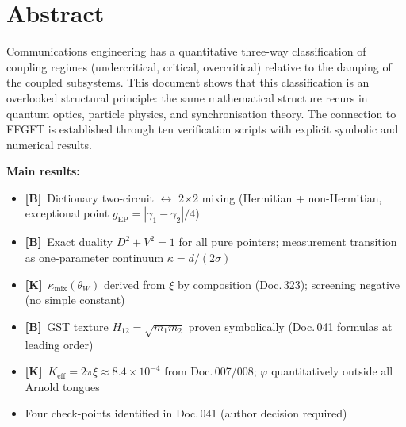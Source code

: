 
\providecommand{\K}{}\renewcommand{\K}{\textbf{[K]}}
\providecommand{\B}{}\renewcommand{\B}{\textbf{[B]}}
\renewcommand{\S}{\textbf{[S]}}
\providecommand{\SET}{}\renewcommand{\SET}{\textbf{[SETZUNG]}}
\providecommand{\E}{}\renewcommand{\E}{\textbf{[E]}}
\providecommand{\kk}{k_{\mathrm{crit}}}
\providecommand{\kmix}{\kappa_{\mathrm{mix}}}
\providecommand{\Keff}{K_{\mathrm{eff}}}
\providecommand{\xipar}{\xi}


\section*{Abstract}

Communications engineering has a quantitative three-way classification of coupling
regimes (undercritical, critical, overcritical) relative to the damping of the
coupled subsystems. This document shows that this classification is an overlooked
structural principle: the same mathematical structure recurs in quantum optics,
particle physics, and synchronisation theory. The connection to FFGFT is established
through ten verification scripts with explicit symbolic and numerical results.

\medskip
\noindent\textbf{Main results:}
\begin{itemize}
  \item \B\ Dictionary two-circuit $\leftrightarrow$ 2$\times$2 mixing (Hermitian +
    non-Hermitian, exceptional point $g_{\mathrm{EP}} = |\gamma_1-\gamma_2|/4$)
  \item \B\ Exact duality $D^2+V^2=1$ for all pure pointers; measurement transition
    as one-parameter continuum $\kappa = d/(2\sigma)$
  \item \K\ $\kmix(\theta_W)$ derived from $\xi$ by composition (Doc.\,323);
    screening negative (no simple constant)
  \item \B\ GST texture $H_{12}=\sqrt{m_1 m_2}$ proven symbolically (Doc.\,041 formulas at leading order)
  \item \K\ $\Keff = 2\pi\xi \approx 8.4\times10^{-4}$ from Doc.\,007/008;
    $\varphi$ quantitatively outside all Arnold tongues
  \item Four check-points identified in Doc.\,041 (author decision required)
\end{itemize}

